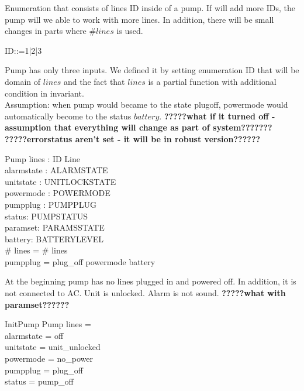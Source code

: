 \documentclass{article}
\begin{document}
	Enumeration that consists of lines ID inside of a pump. If will add more IDs, the pump will we able to work with more lines. In addition, there will be small changes in parts where $\# lines$ is used.
	\begin{zed}
		ID::=1|2|3
	\end{zed}
	
	Pump has only three inputs. We defined it by setting enumeration ID that will be domain of $lines$ and the fact that $lines$ is a partial function with additional condition in invariant.\\
		Assumption: when pump would became to the state plugoff, powermode would automatically become to the status $battery$. \textbf{?????what if it turned off - assumption that everything will change as part of system???????}\\
	
	\textbf{?????errorstatus aren't set - it will be in robust version??????}
	\begin{schema}{Pump}
		lines : ID \pfun Line \\
		alarmstate : ALARMSTATE \\
		unitstate : UNITLOCKSTATE \\
		powermode : POWERMODE \\
		pumpplug : PUMPPLUG \\
		status: PUMPSTATUS \\
		paramset: PARAMSSTATE \\
		battery: BATTERYLEVEL\\
		
	\where
		\# \ran lines = \# \dom lines \\
		pumpplug = plug\_off \implies powermode \neq battery 
	\end{schema}
	
	
	At the beginning pump has no lines plugged in and powered off. In addition, it is not connected to AC. Unit is unlocked. Alarm is not sound. 
	\textbf{?????what with paramset??????}
		
	
	\begin{schema}{InitPump}
		Pump
		\where
		lines = \emptyset \\
		alarmstate = off \\
		unitstate  = unit\_unlocked \\
		powermode =  no\_power \\
		pumpplug = plug\_off \\
		status = pump\_off \\	
	\end{schema}
	
\end{document}
